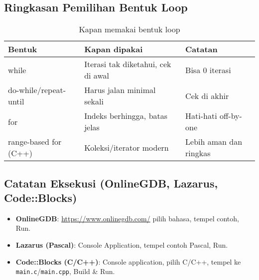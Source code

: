 \documentclass[../main.tex]{subfiles}
\begin{document}
\subsection{Ringkasan Pemilihan Bentuk Loop}
\begin{table}[h]
  \centering
  \caption{Kapan memakai bentuk loop}
  \begin{tabular}{@{}lll@{}}
    \toprule
    Bentuk & Kapan dipakai & Catatan \\
    \midrule
    while & Iterasi tak diketahui, cek di awal & Bisa 0 iterasi \\
    do-while/repeat-until & Harus jalan minimal sekali & Cek di akhir \\
    for & Indeks berhingga, batas jelas & Hati-hati off-by-one \\
    range-based for (C++) & Koleksi/iterator modern & Lebih aman dan ringkas \\
    \bottomrule
  \end{tabular}
\end{table}

\subsection{Catatan Eksekusi (OnlineGDB, Lazarus, Code::Blocks)}
\begin{itemize}
  \item \textbf{OnlineGDB}: \url{https://www.onlinegdb.com/} \textrightarrow{} pilih bahasa, tempel contoh, Run.
  \item \textbf{Lazarus (Pascal)}: Console Application, tempel contoh Pascal, Run.
  \item \textbf{Code::Blocks (C/C++)}: Console application, pilih C/C++, tempel ke \texttt{main.c}/\texttt{main.cpp}, Build \& Run.
\end{itemize}
\end{document}
